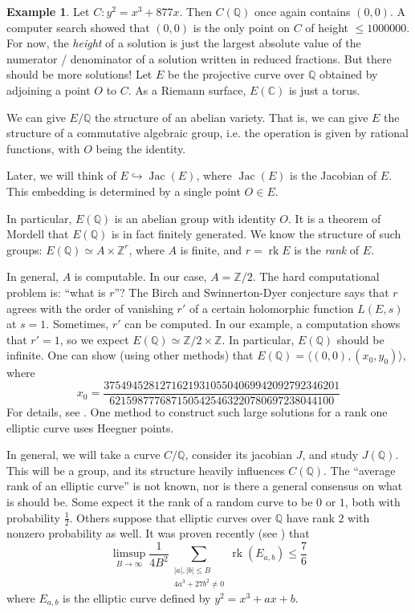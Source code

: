 \documentclass{article}
\theoremstyle{definition}
\newtheorem{example}[subsection]{Example}
\begin{document}
\begin{example}
Let $C:y^2=x^3+877 x$. Then $C(\mathbb{Q})$ once again contains $(0,0)$. A 
computer search showed that $(0,0)$ is the only point on $C$ of height 
$\leqslant 1000000$. For now, the \emph{height} of a solution is just the 
largest absolute value of the numerator / denominator of a solution written 
in reduced fractions. But there should be more solutions! Let $E$ be the 
projective curve over $\mathbb{Q}$ obtained by adjoining a point $O$ to $C$. 
As a Riemann surface, $E(\mathbb{C})$ is just a torus. 

We can give $E/\mathbb{Q}$ the structure of an abelian variety. That is, 
we can give $E$ the structure of a commutative algebraic group, i.e. the 
operation is given by rational functions, with $O$ being the identity. 

Later, we will think of $E\hookrightarrow \operatorname{Jac}(E)$, where 
$\operatorname{Jac}(E)$ is the Jacobian of $E$. This embedding is determined 
by a single point $O\in E$. 

In particular, $E(\mathbb{Q})$ is an abelian group with identity $O$. It is 
a theorem of Mordell that $E(\mathbb{Q})$ is in fact finitely generated. We 
know the structure of such groups: $E(\mathbb{Q})\simeq A\times \mathbb{Z}^r$, 
where $A$ is finite, and $r=\operatorname{rk} E$ is the \emph{rank} of $E$. 

In general, $A$ is computable. In our case, $A=\mathbb{Z}/2$. The hard 
computational problem is: ``what is $r$''? The Birch and Swinnerton-Dyer 
conjecture says that $r$ agrees with the order of vanishing $r'$ of a certain 
holomorphic function $L(E,s)$ at $s=1$. Sometimes, $r'$ can be computed.  
In our example, a computation shows that $r'=1$, so we expect 
$E(\mathbb{Q})\simeq \mathbb{Z}/2\times\mathbb{Z}$. In particular, 
$E(\mathbb{Q})$ should be infinite. One can show (using other methods) that 
$E(\mathbb{Q})=\langle (0,0),(x_0,y_0)\rangle$, where 
\[
  x_0 = \frac{37 5494 5281 2716 2193 1055 0406 9942 0927 9234 6201}{6215 9877 7687 1505 4254 6322 0780 6972 3804 4100}
\]
For details, see \cite{br84}. One method to construct such large solutions for 
a rank one elliptic curve uses Heegner points. 
\end{example}

In general, we will take a curve $C/\mathbb{Q}$, consider its jacobian $J$, 
and study $J(\mathbb{Q})$. This will be a group, and its structure heavily 
influences $C(\mathbb{Q})$. The ``average rank of an elliptic curve'' is not 
known, nor is there a general consensus on what is should be. Some expect it 
the rank of a random curve to be $0$ or $1$, both with probability 
$\frac 1 2$. Others suppose that elliptic curves over $\mathbb{Q}$ have rank 
$2$ with nonzero probability as well. It was proven recently (see 
\cite[\S 1]{bh10}) that 
\[
  \limsup_{B\to\infty} \frac{1}{4 B^2} \sum_{\substack{|a|,|b|\leqslant B \\ 4 a^3+27 b^2\ne 0}} \operatorname{rk}(E_{a,b}) \leqslant\frac 7 6
\]
where $E_{a,b}$ is the elliptic curve defined by $y^2=x^3 +a x+b$.
\end{document}

